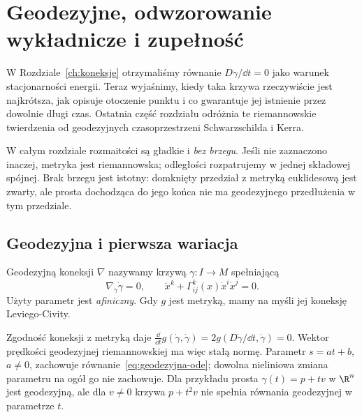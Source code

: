 \chapter{Geodezyjne, odwzorowanie wykładnicze i zupełność}
\label{ch:geodezyjne-exp}

\providecommand{\atlasref}[2]{#2}

W Rozdziale~\ref{ch:koneksje} otrzymaliśmy równanie
$D\dot\gamma/\dd t=0$ jako warunek stacjonarności
energii. Teraz wyjaśnimy, kiedy taka krzywa
rzeczywiście jest najkrótsza, jak opisuje otoczenie
punktu i co gwarantuje jej istnienie przez dowolnie
długi czas. Ostatnia część rozdziału odróżnia te
riemannowskie twierdzenia od geodezyjnych
czasoprzestrzeni Schwarzschilda i Kerra.

W całym rozdziale rozmaitości są gładkie i \emph{bez brzegu}.
Jeśli nie zaznaczono inaczej, metryka jest riemannowska;
odległości rozpatrujemy w jednej składowej spójnej.
Brak brzegu jest istotny: domknięty przedział z metryką
euklidesową jest zwarty, ale prosta dochodząca do jego
końca nie ma geodezyjnego przedłużenia w tym przedziale.

\section{Geodezyjna i pierwsza wariacja}
\label{sec:geodezyjna-pierwsza-wariacja}

\begin{definicja}[Geodezyjna]
\label{def:geodezyjna}
Geodezyjną koneksji $\nabla$ nazywamy krzywą
$\gamma:I\to M$ spełniającą
\begin{equation}\label{eq:geodezyjna-ode}
 \nabla_{\dot\gamma}\dot\gamma=0,
 \qquad
 \ddot x^k+\Gamma^k_{ij}(x)\dot x^i\dot x^j=0.
\end{equation}
Użyty parametr jest \emph{afiniczny}.
Gdy $g$ jest metryką, mamy na myśli jej
koneksję Leviego-Civity.
\end{definicja}

Zgodność koneksji z metryką daje
$\frac{\dd}{\dd t}g(\dot\gamma,\dot\gamma)
=2g(D\dot\gamma/\dd t,\dot\gamma)=0$.
Wektor prędkości geodezyjnej riemannowskiej ma więc stałą
normę. Parametr $s=at+b$, $a\ne0$,
zachowuje równanie~\eqref{eq:geodezyjna-ode};
dowolna nieliniowa zmiana parametru na ogół
go nie zachowuje. Dla przykładu prosta
$\gamma(t)=p+tv$ w $\R^n$ jest geodezyjną,
ale dla $v\ne0$ krzywa $p+t^2v$ nie spełnia równania geodezyjnej
w parametrze $t$.

